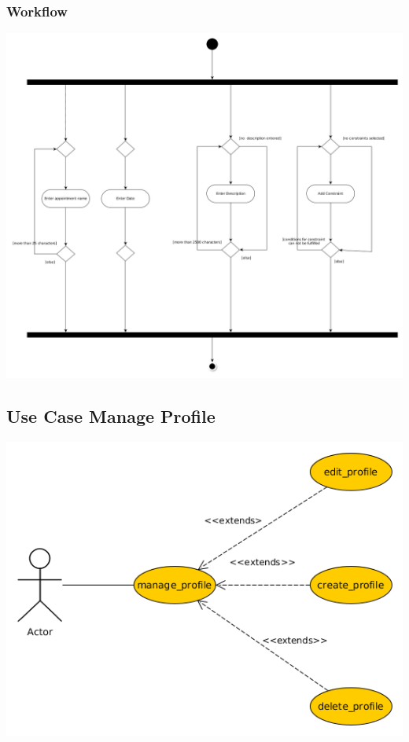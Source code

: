 \documentclass[12pt]{scrartcl}
\begin{document}
    \subsubsection{Workflow}
        \includegraphics[scale=.4]{Materials/Images/manage_appointment_workflow.png}

    \subsection{Use Case Manage Profile} 
        \includegraphics[scale=.5]{Materials/Images/manage_profile_use_case.png}
\end{document}
